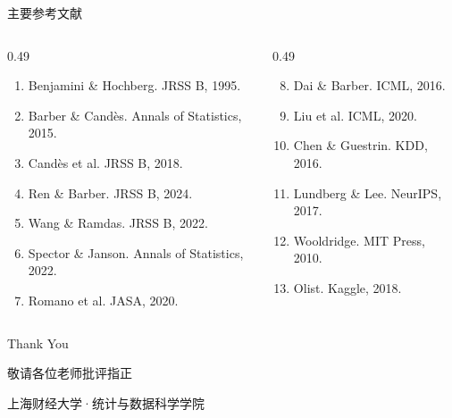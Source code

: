 \documentclass[aspectratio=169]{beamer}
\begin{document}
\begin{frame}[shrink=6]{主要参考文献}
  \tiny
  \begin{columns}[T]
    \begin{column}{0.49\textwidth}
      \begin{enumerate}
        \item Benjamini \& Hochberg. JRSS B, 1995.
        \item Barber \& Candès. Annals of Statistics, 2015.
        \item Candès et al. JRSS B, 2018.
        \item Ren \& Barber. JRSS B, 2024.
        \item Wang \& Ramdas. JRSS B, 2022.
        \item Spector \& Janson. Annals of Statistics, 2022.
        \item Romano et al. JASA, 2020.
      \end{enumerate}
    \end{column}
    \begin{column}{0.49\textwidth}
      \begin{enumerate}
        \setcounter{enumi}{7}
        \item Dai \& Barber. ICML, 2016.
        \item Liu et al. ICML, 2020.
        \item Chen \& Guestrin. KDD, 2016.
        \item Lundberg \& Lee. NeurIPS, 2017.
        \item Wooldridge. MIT Press, 2010.
        \item Olist. Kaggle, 2018.
      \end{enumerate}
    \end{column}
  \end{columns}
\end{frame}

\begin{frame}
  \begin{center}
    {\Huge Thank You}

    \vspace{1cm}
    \Large 敬请各位老师批评指正

    \vspace{0.8cm}
    \normalsize 上海财经大学·统计与数据科学学院
  \end{center}
\end{frame}
\end{document}

